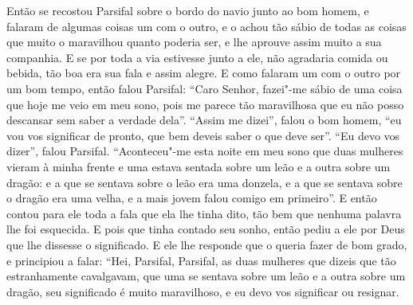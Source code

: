 Então se recostou Parsifal sobre o bordo do navio junto ao bom homem, e
falaram de algumas coisas um com o outro, e o achou tão sábio de todas as
coisas que muito o maravilhou quanto poderia ser, e lhe aprouve assim muito a
sua companhia. E se por toda a via estivesse junto a ele, não agradaria comida
ou bebida, tão boa era sua fala e assim alegre. E como falaram um com
o outro por um bom tempo, então falou Parsifal: “Caro Senhor, fazei"-me sábio
de uma coisa que hoje me veio em meu sono, pois me parece tão maravilhosa que
eu não posso descansar sem saber a verdade dela”. “Assim me dizei”, falou o bom
homem, “eu vou vos significar de pronto, que bem deveis saber o que deve ser”.
“Eu devo vos dizer”, falou Parsifal. “Aconteceu"-me esta noite em meu sono que
duas mulheres vieram à minha frente e uma estava sentada sobre um leão e a
outra sobre um dragão: e a que se sentava sobre o leão era uma donzela, e a que
se sentava sobre o dragão era uma velha, e a mais jovem falou comigo em
primeiro”. E então contou para ele toda a fala que ela lhe tinha dito, tão bem
que nenhuma palavra lhe foi esquecida. E pois que tinha contado seu sonho,
então pediu a ele por Deus que lhe dissesse o significado. E ele lhe responde
que o queria fazer de bom grado, e principiou a falar: “Hei, Parsifal,
Parsifal, as duas mulheres que dizeis que tão estranhamente cavalgavam, que
uma se sentava sobre um leão e a outra sobre um dragão, seu significado é muito
maravilhoso, e eu devo vos significar ou resignar.

